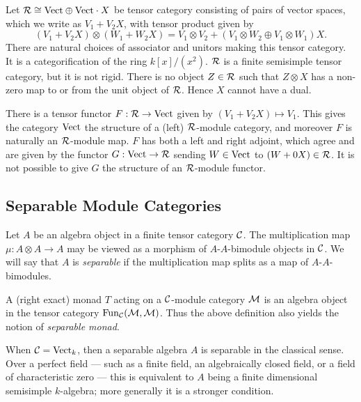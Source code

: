 \documentclass{amsart}
\begin{document}
\begin{example}
	Let $\mathcal R \cong \mathrm{Vect} \oplus \mathrm{Vect} \cdot X$ be tensor category consisting of pairs of vector spaces, which we write as $V_1 + V_2 X$, with tensor product given by 
	\begin{equation*}
		(V_1 + V_2 X) \otimes (W_1 + W_2 X) = V_1 \otimes V_2  +  (V_1 \otimes W_2 \oplus V_1 \otimes W_1)X.
	\end{equation*} 
	There are natural choices of associator and unitors making this tensor category. It is a categorification of the ring $k[x]/(x^2)$. $\mathcal R$ is a finite semisimple tensor category, but it is not rigid. There is no object $Z \in \mathcal R$ such that $Z \otimes X$ has a non-zero map to or from the unit object of $\mathcal R$. Hence $X$ cannot have a dual. 
	
	There is a tensor functor $F:\mathcal R \to \mathrm{Vect}$ given by $(V_1 + V_2 X) \mapsto V_1$. This gives the category $\mathrm{Vect}$ the structure of a (left) $\mathcal R$-module category, and moreover $F$ is naturally an $\mathcal R$-module map. $F$ has both a left and right adjoint, which agree and are given by the functor $G: \mathrm{Vect} \to \mathcal R$ sending $W \in \mathrm{Vect}$ to $(W + 0 X) \in \mathcal R$. It is not possible to give $G$ the structure of an $\mathcal R$-module functor. 
\end{example}

\subsection{Separable Module Categories} \label{sec-tc-separable}


\begin{definition}
	Let $A$ be an algebra object in a finite tensor category $\mathcal C$. The multiplication map $\mu: A \otimes A \to A$ may be viewed as a morphism of $A$-$A$-bimodule objects in $\mathcal C$. We will say that $A$ is {\em separable} if the multiplication map splits as a map of $A$-$A$-bimodules. 
\end{definition}

\begin{remark}
	A (right exact) monad $T$ acting on a $\mathcal C$-module category $\mathcal M$ is an algebra object in the tensor category $\operatorname{Fun}_\mathcal C(\mathcal M, \mathcal M)$. Thus the above definition also yields the notion of {\em separable monad}. 
\end{remark}

\begin{remark}
	When $\mathcal C = \mathrm{Vect}_k$, then a separable algebra $A$ is separable in the classical sense. Over a perfect field --- such as a finite field, an algebraically closed field, or a field of characteristic zero --- this is equivalent to $A$ being a finite dimensional semisimple $k$-algebra; more generally it is a stronger condition. 
\end{remark}
\end{document}
